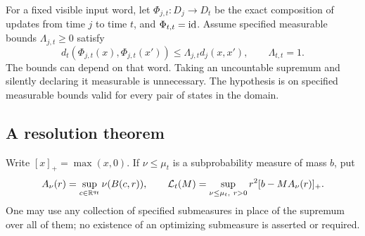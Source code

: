 For a fixed visible input word, let $\Phi_{j,t}:D_j\to D_t$ be the exact
composition of updates from time $j$ to time $t$, and $\Phi_{t,t}=\operatorname{id}$.
Assume specified measurable bounds $\Lambda_{j,t}\ge0$ satisfy
\begin{equation}\label{eq:v2-suffix}
 d_t(\Phi_{j,t}(x),\Phi_{j,t}(x'))
 \le\Lambda_{j,t}d_j(x,x'),\qquad \Lambda_{t,t}=1.
\end{equation}
The bounds can depend on that word. Taking an uncountable supremum and
silently declaring it measurable is unnecessary. The hypothesis is on
specified measurable bounds valid for every pair of states in the domain.

\subsection{A resolution theorem}
Write $[x]_+=\max(x,0)$. If $\nu\le\mu_t$ is a subprobability measure of
mass $b$, put
\[
 A_\nu(r)=\sup_{c\in\mathbb R^{q_t}}\nu(B(c,r)),\qquad
 \mathcal L_t(M)=\sup_{\nu\le\mu_t,\ r>0}
          r^2[b-MA_\nu(r)]_+.
\]
One may use any collection of specified submeasures in place of the
supremum over all of them; no existence of an optimizing submeasure is
asserted or required.

